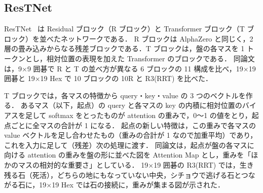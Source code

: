 \documentclass[submit]{ipsj}
\begin{document}
\subsection{ResTNet}
\label{sec:restnet}
ResTNet~\cite{restnet} は Residual ブロック（R ブロック）と Transformer ブロック（T ブロック）を並べたネットワークである．
R ブロックは AlphaZero と同じく，2 層の畳み込みからなる残差ブロックである．T ブロックは，盤の各マスを 1 トークンとし，相対位置の表現を加えた Transformer のブロックである．
同論文は，9×9 囲碁で R と T の並べ方が異なる 6 ブロックの 11 構成を比べ，19×19 囲碁と 19×19 Hex で 10 ブロックの 10R と R3(RRT) を比べた．

T ブロックでは，各マスの特徴から query・key・value の 3 つのベクトルを作る．
あるマス（以下，起点）の query と各マスの key の内積に相対位置のバイアスを足して softmax をとったものが attention の重みで，0〜1 の値をとり，起点ごとに全マスの合計が 1 になる．
起点の新しい特徴は，この重みで各マスの value ベクトルを足し合わせたもの（重みの合計が 1 なので加重平均）であり，これを入力に足して（残差）次の処理に渡す．
同論文は，起点が盤の各マスに向ける attention の重みを盤の形に並べた図を Attention Map とし，重みを「ほかのマスの相対的な重要さ」としている．
19×19 囲碁の R3(RRT) では，生き残る石（死活），どちらの地にもなっていない中央，シチョウで逃げる石とつながる石に，19×19 Hex では石の接続に，重みが集まる図が示された．
\end{document}
